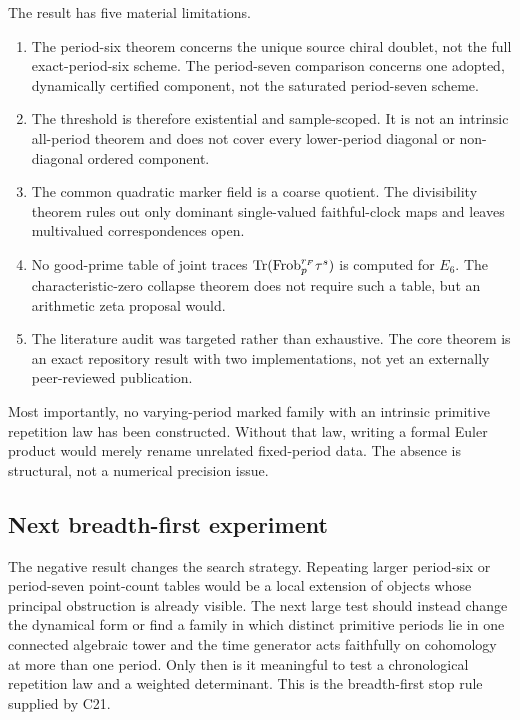 The result has five material limitations.
\begin{enumerate}
 \item The period-six theorem concerns the unique source chiral doublet, not
 the full exact-period-six scheme.  The period-seven comparison concerns one
 adopted, dynamically certified component, not the saturated period-seven
 scheme.
 \item The threshold is therefore existential and sample-scoped.  It is not
 an intrinsic all-period theorem and does not cover every lower-period
 diagonal or non-diagonal ordered component.
 \item The common quadratic marker field is a coarse quotient.  The
 divisibility theorem rules out only dominant single-valued faithful-clock
 maps and leaves multivalued correspondences open.
 \item No good-prime table of joint traces
 $\operatorname{Tr}(\mathrm{Frob}_p^{r_F}\tau^s)$ is computed for $E_6$.  The
 characteristic-zero collapse theorem does not require such a table, but an
 arithmetic zeta proposal would.
 \item The literature audit was targeted rather than exhaustive.  The core
 theorem is an exact repository result with two implementations, not yet an
 externally peer-reviewed publication.
\end{enumerate}

Most importantly, no varying-period marked family with an intrinsic
primitive repetition law has been constructed.  Without that law, writing a
formal Euler product would merely rename unrelated fixed-period data.  The
absence is structural, not a numerical precision issue.

\subsection{Next breadth-first experiment}

The negative result changes the search strategy.  Repeating larger
period-six or period-seven point-count tables would be a local extension of
objects whose principal obstruction is already visible.  The next large
test should instead change the dynamical form or find a family in which
distinct primitive periods lie in one connected algebraic tower and the
time generator acts faithfully on cohomology at more than one period.  Only
then is it meaningful to test a chronological repetition law and a weighted
determinant.  This is the breadth-first stop rule supplied by C21.
